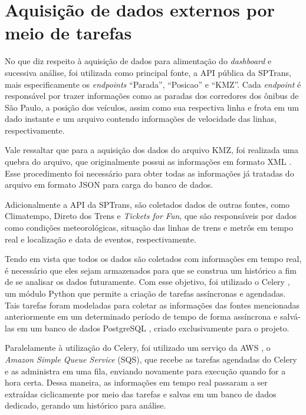 \section{Aquisição de dados externos por meio de tarefas}
\indent
\par No que diz respeito à aquisição de dados para alimentação do \textit{dashboard} e sucessiva análise, foi utilizada como principal fonte, a API pública da SPTrans, mais especificamente os \textit{endpoints} \cite{Schultz2020} “Parada”, “Posicao” e “KMZ”. Cada \textit{endpoint} é responsável por trazer informações como as paradas dos corredores dos ônibus de São Paulo, a posição dos veículos, assim como sua respectiva linha e frota em um dado instante e um arquivo \cite{TechTudo2016} contendo informações de velocidade das linhas, respectivamente.
\indent
\par Vale ressaltar que para a aquisição dos dados do arquivo KMZ, foi realizada uma quebra do arquivo, que originalmente possui as informações em formato XML \cite{Magalhaes2020}. Esse procedimento foi necessário para obter todas as informações já tratadas do arquivo em formato JSON \cite{JSON} para carga do banco de dados.
\indent
\par Adicionalmente a API da SPTrans, são coletados dados de outras fontes, como Climatempo, Direto dos Trens e \textit{Tickets for Fun}, que são responsáveis por dados como condições meteorológicas, situação das linhas de trens e metrôs em tempo real e localização e data de eventos, respectivamente.
\indent
\par Tendo em vista que todos os dados são coletados com informações em tempo real, é necessário que eles sejam armazenados para que se construa um histórico a fim de se analisar os dados futuramente. Com esse objetivo, foi utilizado o Celery \cite{Celery}, um módulo Python que permite a criação de tarefas assíncronas e agendadas. Tais tarefas foram modeladas para coletar as informações das fontes mencionadas anteriormente em um determinado período de tempo de forma assíncrona e salvá-las em um banco de dados PostgreSQL \cite{PostgreSQL}, criado exclusivamente para o projeto.
\indent
\par Paralelamente à utilização do Celery, foi utilizado um serviço da AWS \cite{AWS}, o \textit{Amazon Simple Queue Service} (SQS), que recebe as tarefas agendadas do Celery e as administra em uma fila, enviando novamente para execução quando for a hora certa. Dessa maneira, as informações em tempo real passaram a ser extraídas ciclicamente por meio das tarefas e salvas em um banco de dados dedicado, gerando um histórico para análise.

